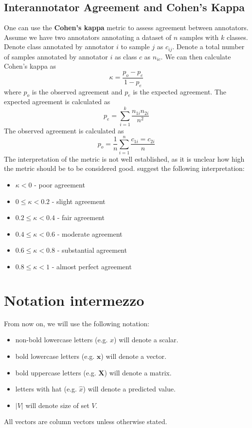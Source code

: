 \subsection{Interannotator Agreement and Cohen's Kappa}
\label{sec:interannotator}
One can use the \textbf{Cohen's kappa} metric to assess agreement between annotators.
Assume we have two annotators annotating a dataset of $n$ samples with $k$ classes.
Denote class annotated by annotator $i$ to sample $j$ as $c_{ij}$.
Denote a total number of samples annotated by annotator $i$ as class $c$ as $n_{ic}$.
We can then calculate Cohen's kappa as
\begin{equation*}
    \label{eq:kappa}
    \kappa = \frac{p_o - p_e}{1 - p_e}
\end{equation*}
where $p_o$ is the observed agreement and $p_e$ is the expected agreement.
The expected agreement is calculated as
\begin{equation*}
    \label{eq:pe}
    p_e = \sum_{i=1}^k \frac{n_{1i} n_{2i}}{n^2}
\end{equation*}
The observed agreement is calculated as
\begin{equation*}
    \label{eq:po}
    p_o = \frac{1}{n} \sum_{i=1}^n \frac{c_{1i} = c_{2i}}{n}
\end{equation*}
The interpretation of the metric is not well established, as
it is unclear how high the metric should be to be considered good.
\textcite[page 165]{landisMeasurementObserverAgreement1977} suggest the following interpretation:
\begin{itemize}
    \item $\kappa < 0$ - poor agreement
    \item $0 \leq \kappa < 0.2$ - slight agreement
    \item $0.2 \leq \kappa < 0.4$ - fair agreement
    \item $0.4 \leq \kappa < 0.6$ - moderate agreement
    \item $0.6 \leq \kappa < 0.8$ - substantial agreement
    \item $0.8 \leq \kappa < 1$ - almost perfect agreement
\end{itemize}

\section{Notation intermezzo}
\label{sec:notation}
From now on, we will use the following notation:
\begin{itemize}
    \item non-bold lowercase letters (e.g. $x$) will denote a scalar.
    \item bold lowercase letters (e.g. $\mathbf{x}$) will denote a vector.
    \item bold uppercase letters (e.g. $\mathbf{X}$) will denote a matrix.
    \item letters with hat (e.g. $\hat{x}$) will denote a predicted value.
    \item $|V|$ will denote size of set $V$.
\end{itemize}
All vectors are column vectors unless otherwise stated.


